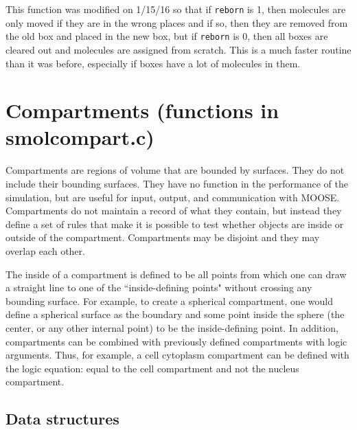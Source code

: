 \documentclass {scrbook}
\newcommand {\ttt} {\texttt}
\begin{document}
\begin{description}
This function was modified on 1/15/16 so that if \ttt{reborn} is 1, then molecules are only moved if they are in the wrong places and if so, then they are removed from the old box and placed in the new box, but if \ttt{reborn} is 0, then all boxes are cleared out and molecules are assigned from scratch. This is a much faster routine than it was before, especially if boxes have a lot of molecules in them.

\end{description}

\section{Compartments (functions in smolcompart.c)}

Compartments are regions of volume that are bounded by surfaces. They do not include their bounding surfaces. They have no function in the performance of the simulation, but are useful for input, output, and communication with MOOSE. Compartments do not maintain a record of what they contain, but instead they define a set of rules that make it is possible to test whether objects are inside or outside of the compartment. Compartments may be disjoint and they may overlap each other.

The inside of a compartment is defined to be all points from which one can draw a straight line to one of the ``inside-defining points" without crossing any bounding surface. For example, to create a spherical compartment, one would define a spherical surface as the boundary and some point inside the sphere (the center, or any other internal point) to be the inside-defining point. In addition, compartments can be combined with previously defined compartments with logic arguments. Thus, for example, a cell cytoplasm compartment can be defined with the logic equation: equal to the cell compartment and not the nucleus compartment.

\subsection{Data structures}
\end{document}
